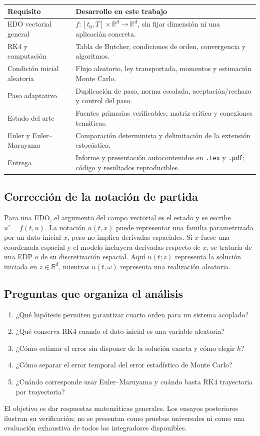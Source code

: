 \documentclass[11pt,a4paper]{article}
\theoremstyle{definition}\newtheorem{definition}[theorem]{Definición}
\theoremstyle{remark}\newtheorem{remark}[theorem]{Observación}
\newcommand{\R}{\mathbb R}\newcommand{\E}{\mathbb E}
\begin{document}
\begin{center}\small
\begin{tabularx}{\linewidth}{@{}p{4.3cm}X@{}}\toprule
Requisito & Desarrollo en este trabajo\\\midrule
EDO vectorial general & $f:[t_0,T]\times\R^d\to\R^d$, sin fijar dimensión ni una aplicación concreta.\\
RK4 y computación & Tabla de Butcher, condiciones de orden, convergencia y algoritmos.\\
Condición inicial aleatoria & Flujo aleatorio, ley transportada, momentos y estimación Monte Carlo.\\
Paso adaptativo & Duplicación de paso, norma escalada, aceptación/rechazo y control del paso.\\
Estado del arte & Fuentes primarias verificables, matriz crítica y conexiones temáticas.\\
Euler y Euler--Maruyama & Comparación determinista y delimitación de la extensión estocástica.\\
Entrega & Informe y presentación autocontenidos en \texttt{.tex} y \texttt{.pdf}; código y resultados reproducibles.\\\bottomrule
\end{tabularx}\end{center}

\subsection{Corrección de la notación de partida}
Para una EDO, el argumento del campo vectorial es el estado y se escribe
$u'=f(t,u)$. La notación $u(t,x)$ puede representar una familia parametrizada
por un dato inicial $x$, pero no implica derivadas espaciales. Si $x$ fuese
una coordenada espacial y el modelo incluyera derivadas respecto de $x$, se
trataría de una EDP o de su discretización espacial. Aquí $u(t;z)$ representa
la solución iniciada en $z\in\R^d$, mientras $u(t,\omega)$ representa una
realización aleatoria.

\subsection{Preguntas que organiza el análisis}
\begin{enumerate}
\item ¿Qué hipótesis permiten garantizar cuarto orden para un sistema acoplado?
\item ¿Qué conserva RK4 cuando el dato inicial es una variable aleatoria?
\item ¿Cómo estimar el error sin disponer de la solución exacta y cómo elegir $h$?
\item ¿Cómo separar el error temporal del error estadístico de Monte Carlo?
\item ¿Cuándo corresponde usar Euler--Maruyama y cuándo basta RK4 trayectoria por trayectoria?
\end{enumerate}
El objetivo es dar respuestas matemáticas generales. Los ensayos posteriores
ilustran su verificación; no se presentan como pruebas universales ni como
una evaluación exhaustiva de todos los integradores disponibles.
\end{document}
